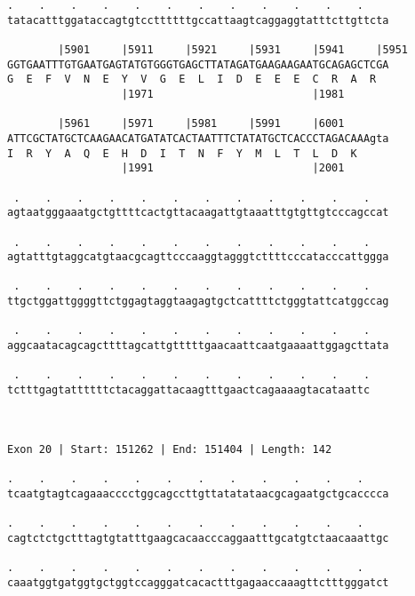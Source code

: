 \documentclass{article}
\begin{document}
\begin{Verbatim}
.    .    .    .    .    .    .    .    .    .    .    .    
tatacatttggataccagtgtccttttttgccattaagtcaggaggtatttcttgttcta
                                                            
        |5901     |5911     |5921     |5931     |5941     |5951
GGTGAATTTGTGAATGAGTATGTGGGTGAGCTTATAGATGAAGAAGAATGCAGAGCTCGA
G  E  F  V  N  E  Y  V  G  E  L  I  D  E  E  E  C  R  A  R  
                  |1971                         |1981       
  
        |5961     |5971     |5981     |5991     |6001       
ATTCGCTATGCTCAAGAACATGATATCACTAATTTCTATATGCTCACCCTAGACAAAgta
I  R  Y  A  Q  E  H  D  I  T  N  F  Y  M  L  T  L  D  K     
                  |1991                         |2001       
  
 .    .    .    .    .    .    .    .    .    .    .    .   
agtaatgggaaatgctgttttcactgttacaagattgtaaatttgtgttgtcccagccat
                                                            
 .    .    .    .    .    .    .    .    .    .    .    .   
agtatttgtaggcatgtaacgcagttcccaaggtagggtcttttcccatacccattggga
                                                            
 .    .    .    .    .    .    .    .    .    .    .    .   
ttgctggattggggttctggagtaggtaagagtgctcattttctgggtattcatggccag
                                                            
 .    .    .    .    .    .    .    .    .    .    .    .   
aggcaatacagcagcttttagcattgtttttgaacaattcaatgaaaattggagcttata
                                                            
 .    .    .    .    .    .    .    .    .    .    .    .
tctttgagtattttttctacaggattacaagtttgaactcagaaaagtacataattc
                                                         
                                                         
 
Exon 20 | Start: 151262 | End: 151404 | Length: 142
 
.    .    .    .    .    .    .    .    .    .    .    .    
tcaatgtagtcagaaacccctggcagccttgttatatataacgcagaatgctgcacccca
                                                            
.    .    .    .    .    .    .    .    .    .    .    .    
cagtctctgctttagtgtatttgaagcacaacccaggaatttgcatgtctaacaaattgc
                                                            
.    .    .    .    .    .    .    .    .    .    .    .    
caaatggtgatggtgctggtccagggatcacactttgagaaccaaagttctttgggatct
                                                            

\end{Verbatim}
\end{document}
